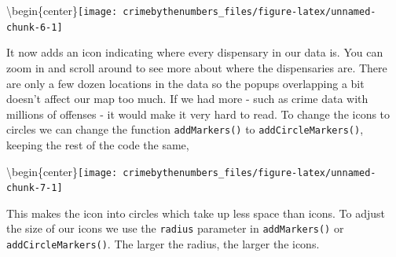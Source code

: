 \documentclass[
  12pt,
]{book}
\newenvironment{Shaded}{\begin{snugshade}}{\end{snugshade}}
\newcommand{\DataTypeTok}[1]{\textcolor[rgb]{0.27,0.27,0.27}{#1}}
\newcommand{\DecValTok}[1]{\textcolor[rgb]{0.06,0.06,0.06}{#1}}
\newcommand{\KeywordTok}[1]{\textcolor[rgb]{0.27,0.27,0.27}{\textbf{#1}}}
\newcommand{\NormalTok}[1]{#1}
\newcommand{\OperatorTok}[1]{\textcolor[rgb]{0.43,0.43,0.43}{\textbf{#1}}}
\newcommand{\StringTok}[1]{\textcolor[rgb]{0.5,0.5,0.5}{#1}}
\begin{document}
\textbackslash begin\{center\}\texttt{[image: crimebythenumbers\_files/figure-latex/unnamed-chunk-6-1]}

It now adds an icon indicating where every dispensary in our data is. You can zoom in and scroll around to see more about where the dispensaries are. There are only a few dozen locations in the data so the popups overlapping a bit doesn't affect our map too much. If we had more - such as crime data with millions of offenses - it would make it very hard to read. To change the icons to circles we can change the function \texttt{addMarkers()} to \texttt{addCircleMarkers()}, keeping the rest of the code the same,

\begin{Shaded}
\end{Shaded}

\textbackslash begin\{center\}\texttt{[image: crimebythenumbers\_files/figure-latex/unnamed-chunk-7-1]}

This makes the icon into circles which take up less space than icons. To adjust the size of our icons we use the \texttt{radius} parameter in \texttt{addMarkers()} or \texttt{addCircleMarkers()}. The larger the radius, the larger the icons.

\begin{Shaded}
\end{Shaded}
\end{document}
